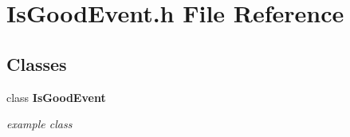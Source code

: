 \section{Is\-Good\-Event.h File Reference}
\label{IsGoodEvent_8h}
\subsection*{Classes}
\begin{CompactItemize}
\item 
class {\bf Is\-Good\-Event}
\begin{CompactList}\small\item\em example class \item\end{CompactList}\end{CompactItemize}
